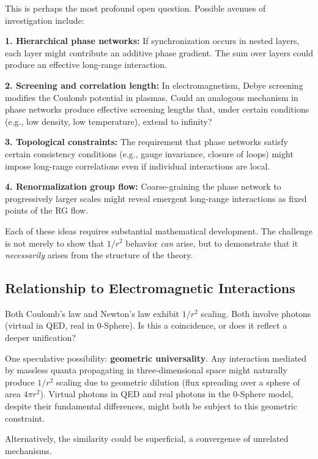 \documentclass[12pt,letterpaper]{article}
\begin{document}
This is perhaps the most profound open question. Possible avenues of investigation include:

\textbf{1. Hierarchical phase networks:} If synchronization occurs in nested layers, each layer might contribute an additive phase gradient. The sum over layers could produce an effective long-range interaction.

\textbf{2. Screening and correlation length:} In electromagnetism, Debye screening modifies the Coulomb potential in plasmas. Could an analogous mechanism in phase networks produce effective screening lengths that, under certain conditions (e.g., low density, low temperature), extend to infinity?

\textbf{3. Topological constraints:} The requirement that phase networks satisfy certain consistency conditions (e.g., gauge invariance, closure of loops) might impose long-range correlations even if individual interactions are local.

\textbf{4. Renormalization group flow:} Coarse-graining the phase network to progressively larger scales might reveal emergent long-range interactions as fixed points of the RG flow.

Each of these ideas requires substantial mathematical development. The challenge is not merely to show that $1/r^2$ behavior \textit{can} arise, but to demonstrate that it \textit{necessarily} arises from the structure of the theory.


\subsection{Relationship to Electromagnetic Interactions}
\label{subsec:em_relationship}

Both Coulomb's law and Newton's law exhibit $1/r^2$ scaling. Both involve photons (virtual in QED, real in 0-Sphere). Is this a coincidence, or does it reflect a deeper unification?

One speculative possibility: \textbf{geometric universality}. Any interaction mediated by massless quanta propagating in three-dimensional space might naturally produce $1/r^2$ scaling due to geometric dilution (flux spreading over a sphere of area $4\pi r^2$). Virtual photons in QED and real photons in the 0-Sphere model, despite their fundamental differences, might both be subject to this geometric constraint.

Alternatively, the similarity could be superficial, a convergence of unrelated mechanisms.
\end{document}
